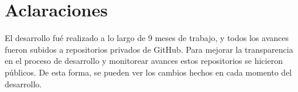 \section{Aclaraciones}

El desarrollo fué realizado a lo largo de 9 meses de trabajo, y todos los avances fueron subidos a repositorios privados de GitHub.
Para mejorar la transparencia en el proceso de desarrollo y monitorear avances estos repositorios se hicieron públicos.
De esta forma, se pueden ver los cambios hechos en cada momento del desarrollo.